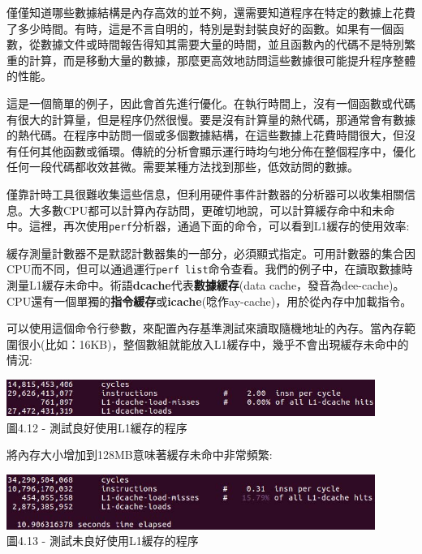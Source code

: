 僅僅知道哪些數據結構是內存高效的並不夠，還需要知道程序在特定的數據上花費了多少時間。有時，這是不言自明的，特別是對封裝良好的函數。如果有一個函數，從數據文件或時間報告得知其需要大量的時間，並且函數內的代碼不是特別繁重的計算，而是移動大量的數據，那麼更高效地訪問這些數據很可能提升程序整體的性能。

這是一個簡單的例子，因此會首先進行優化。在執行時間上，沒有一個函數或代碼有很大的計算量，但是程序仍然很慢。要是沒有計算量的熱代碼，那通常會有數據的熱代碼。在程序中訪問一個或多個數據結構，在這些數據上花費時間很大，但沒有任何其他函數或循環。傳統的分析會顯示運行時均勻地分佈在整個程序中，優化任何一段代碼都收效甚微。需要某種方法找到那些，低效訪問的數據。

僅靠計時工具很難收集這些信息，但利用硬件事件計數器的分析器可以收集相關信息。大多數CPU都可以計算內存訪問，更確切地說，可以計算緩存命中和未命中。這裡，再次使用\texttt{perf}分析器，通過下面的命令，可以看到L1緩存的使用效率:


緩存測量計數器不是默認計數器集的一部分，必須顯式指定。可用計數器的集合因CPU而不同，但可以通過運行\texttt{perf list}命令查看。我們的例子中，在讀取數據時測量L1緩存未命中。術語\textbf{dcache}代表\textbf{數據緩存}(data cache，發音為dee-cache)。CPU還有一個單獨的\textbf{指令緩存}或\textbf{icache}(唸作ay-cache)，用於從內存中加載指令。

可以使用這個命令行參數，來配置內存基準測試來讀取隨機地址的內存。當內存範圍很小(比如：16KB)，整個數組就能放入L1緩存中，幾乎不會出現緩存未命中的情況:

\begin{center}
\includegraphics[width=0.9\textwidth]{content/1/chapter4/images/12.jpg}\\
圖4.12 - 測試良好使用L1緩存的程序
\end{center}

將內存大小增加到128MB意味著緩存未命中非常頻繁:

\begin{center}
\includegraphics[width=0.9\textwidth]{content/1/chapter4/images/13.jpg}\\
圖4.13 - 測試未良好使用L1緩存的程序
\end{center}

